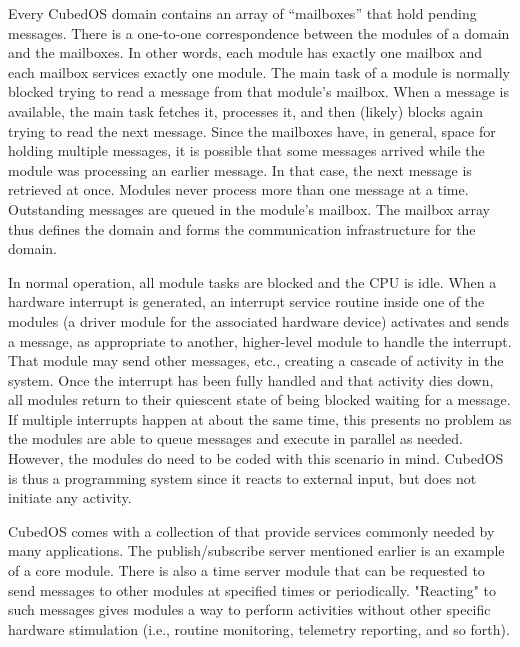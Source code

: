 \documentclass{scrreprt}
\begin{document}
Every CubedOS domain contains an array of ``mailboxes'' that hold pending messages. There is a
one-to-one correspondence between the modules of a domain and the mailboxes. In other words,
each module has exactly one mailbox and each mailbox services exactly one module. The main task
of a module is normally blocked trying to read a message from that module's mailbox. When a
message is available, the main task fetches it, processes it, and then (likely) blocks again
trying to read the next message. Since the mailboxes have, in general, space for holding
multiple messages, it is possible that some messages arrived while the module was processing an
earlier message. In that case, the next message is retrieved at once. Modules never process more
than one message at a time. Outstanding messages are queued in the module's mailbox. The mailbox
array thus defines the domain and forms the communication infrastructure for the domain.

In normal operation, all module tasks are blocked and the CPU is idle. When a hardware interrupt
is generated, an interrupt service routine inside one of the modules (a driver module for the
associated hardware device) activates and sends a message, as appropriate to another,
higher-level module to handle the interrupt. That module may send other messages, etc., creating
a cascade of activity in the system. Once the interrupt has been fully handled and that activity
dies down, all modules return to their quiescent state of being blocked waiting for a message.
If multiple interrupts happen at about the same time, this presents no problem as the modules
are able to queue messages and execute in parallel as needed. However, the modules do need to be
coded with this scenario in mind. CubedOS is thus a  programming system since
it reacts to external input, but does not initiate any activity.

CubedOS comes with a collection of  that provide services commonly needed
by many applications. The publish/subscribe server mentioned earlier is an example of a core
module. There is also a time server module that can be requested to send messages to other
modules at specified times or periodically. "Reacting" to such messages gives modules a way to
perform activities without other specific hardware stimulation (i.e., routine monitoring,
telemetry reporting, and so forth).
\end{document}
